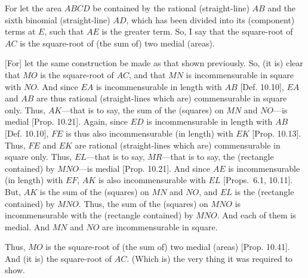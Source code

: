 \begin{Parallel}{}{}
{\epsfysize=1.35in
\centerline{}

For let the area $ABCD$ be contained by the rational (straight-line)
$AB$ and the sixth binomial (straight-line) $AD$, which has been
divided into its (component) terms at $E$, such that $AE$ is the greater
term. So, I say that the square-root of $AC$ is the square-root
of (the sum of) two medial (areas).

\mbox{[}For] let the same construction  be made as that shown previously. So, (it is)
clear that $MO$ is the square-root of $AC$, and that $MN$ is incommensurable
in square with $NO$. And since $EA$ is incommensurable
in length with $AB$ [Def. 10.10], $EA$ and $AB$ are thus rational (straight-lines
which are) commensurable in square only. Thus, $AK$---that is to
say, the sum of the (squares) on $MN$ and $NO$---is medial [Prop. 10.21]. Again, since  $ED$ is incommensurable in length with $AB$  [Def. 10.10], $FE$ is thus also incommensurable 
(in length) with $EK$ [Prop. 10.13]. 
Thus, $FE$ and $EK$ are rational (straight-lines which are) commensurable
in square only. Thus, $EL$---that is to say,  $MR$---that is to say,
the (rectangle contained) by $MNO$---is medial [Prop. 10.21]. And since $AE$ is incommensurable
(in length) with $EF$, $AK$ is also incommensurable with $EL$
[Props.~6.1, 10.11]. 
But, $AK$ is the sum of the (squares) on $MN$ and $NO$, and $EL$
is the (rectangle contained) by $MNO$. Thus,
the sum of the (squares) on $MNO$ is incommensurable with the (rectangle
contained) by $MNO$. And each of them is medial.  And $MN$ and
$NO$ are incommensurable in square.

Thus, $MO$ is the square-root of (the sum of) two medial (areas) [Prop. 10.41].
And (it is) the square-root of $AC$. (Which is) the very thing it was required
to show.}
\end{Parallel}


~\\

